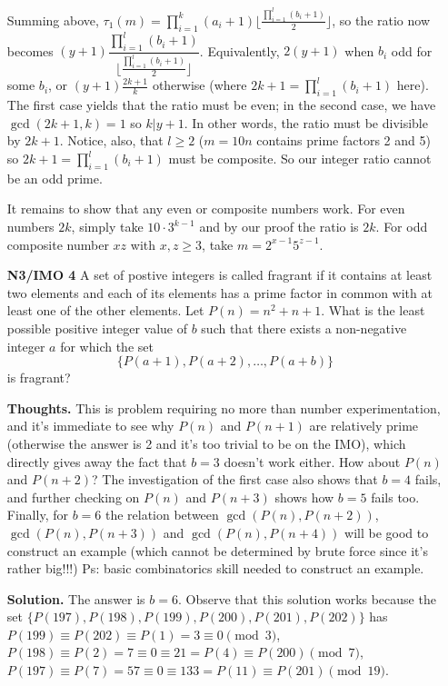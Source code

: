 \documentclass[11pt,a4paper]{article}
\begin{document}
\begin{itemize}
Summing above, $\tau_1 (m)=\displaystyle\prod_{i=1}^{k}(a_i+1)\lfloor\frac{\prod_{i=1}^{l}(b_i+1)}{2} \rfloor$, 
so the ratio now becomes 
$(y+1)\dfrac{\displaystyle\prod_{i=1}^{l}(b_i+1)}{\lfloor\frac{\prod_{i=1}^{l}(b_i+1)}{2} \rfloor}$. 
Equivalently, $2(y+1)$ when $b_i$ odd for some $b_i$, or $(y+1)\frac{2k+1}{k}$ otherwise (where $2k+1=\displaystyle\prod_{i=1}^{l}(b_i+1)$ here). 
The first case yields that the ratio must be even; in the second case, we have $\gcd(2k+1, k)=1$ so $k|y+1$. 
In other words, the ratio must be divisible by $2k+1$. 
Notice, also, that $l\ge 2$ ($m=10n$ contains prime factors 2 and 5) so $2k+1=\displaystyle\prod_{i=1}^{l}(b_i+1)$ must be composite. 
So our integer ratio cannot be an odd prime. 

It remains to show that any even or composite numbers work. 
For even numbers $2k$, simply take $10\cdot 3^{k-1}$ and by our proof the ratio is $2k$. 
For odd composite number $xz$ with $x, z\ge 3$, take $m=2^{x-1}5^{z-1}$. 


\newpage

\item[\textbf{N3/IMO 4}]
A set of postive integers is called fragrant if it contains at least two elements and each of its elements has a prime factor in common with at least one of the other elements. Let $P(n)=n^2+n+1$. What is the least possible positive integer value of $b$ such that there exists a non-negative integer $a$ for which the set $$\{P(a+1),P(a+2),\ldots,P(a+b)\}$$is fragrant?

\textbf{Thoughts.} This is  problem requiring no more than number experimentation, 
and it's immediate to see why $P(n)$ and $P(n+1)$ are relatively prime (otherwise the answer is 2 and it's too trivial to be on the IMO), which directly gives away the fact that $b=3$ doesn't work either. 
How about $P(n)$ and $P(n+2)$? The investigation of the first case also shows that $b=4$ fails, and further checking on $P(n)$ and $P(n+3)$ shows how $b=5$ fails too. 
Finally, for $b=6$ the relation between $\gcd(P(n), P(n+2))$, $\gcd(P(n), P(n+3))$ and $\gcd(P(n), P(n+4))$ will be good to construct an example (which cannot be determined by brute force since it's rather big!!!)
Ps: basic combinatorics skill needed to construct an example. 

\textbf{Solution.} The answer is $b=6.$ 
Observe that this solution works because the set $\{P(197), P(198), P(199), P(200), P(201), P(202)\}$ has 
$P(199)\equiv P(202)\equiv P(1)=3\equiv 0\pmod{3}$, 
$P(198)\equiv P(2)=7\equiv 0\equiv 21=P(4)\equiv P(200)\pmod {7}$, 
$P(197)\equiv P(7)=57\equiv 0\equiv 133=P(11)\equiv P(201)\pmod{19}$. 


\end{itemize}
\end{document}
